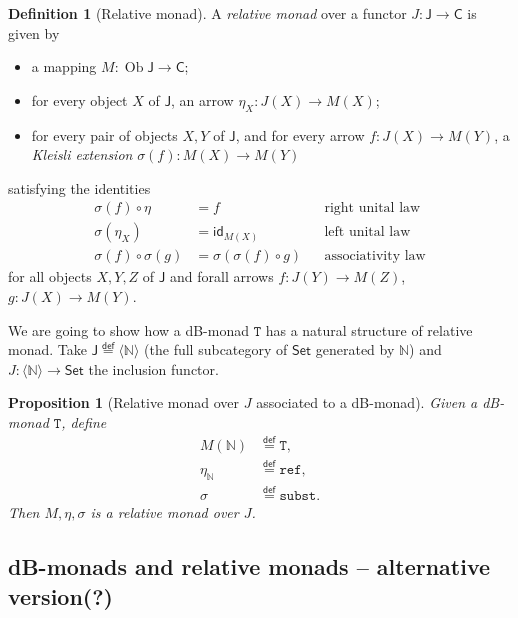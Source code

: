 \documentclass[a4paper,twoside,12pt]{article}
\newtheorem{proposition}{Proposition}
\theoremstyle{definition}
\newtheorem{definition}{Definition}
\theoremstyle{remark}
\DeclareMathOperator{\Ob}{Ob}
\newcommand{\NN}{\mathbb{N}}
\newcommand{\subst}{\mathtt{subst}}
\newcommand{\refe}{\mathtt{ref}}
\newcommand{\TT}{\mathtt{T}}
\begin{document}
\begin{definition}[Relative monad]
  A \emph{relative monad} over a functor
  $J\colon \mathsf{J}\to \mathsf{C}$ is given by
  \begin{itemize}
  \item a mapping $M:\Ob \mathsf{J} \to \mathsf{C}$;
  \item for every object $X$ of $\mathsf{J}$, an arrow $\eta_X\colon
    J(X) \to M(X)$;
  \item for every pair of objects $X,Y$ of $\mathsf{J}$, and for every
    arrow $f\colon J(X) \to M(Y)$, a \emph{Kleisli extension}
    $\sigma(f) \colon M(X) \to M(Y)$
  \end{itemize}
  satisfying the identities
  \begin{align*}
    \sigma(f) \circ \eta &= f &&\text{right unital law} \\
    \sigma(\eta_X) &= \mathsf{id}_{M(X)} &&\text{left unital law} \\
    \sigma(f) \circ \sigma(g) &= \sigma(\sigma(f) \circ g) &&\text{associativity law}
  \end{align*}
  for all objects $X,Y,Z$ of $\mathsf{J}$ and forall arrows
  $f\colon J(Y)\to M(Z)$, $g\colon J(X)\to M(Y)$.
\end{definition}

We are going to show how a dB-monad $\TT$ has a natural structure of
relative monad.  Take
$\mathsf{J} \stackrel{\mathsf{def}}{=}\langle \NN \rangle$ (the full
subcategory of $\mathsf{Set}$ generated by $\NN$) and
$J\colon \langle \NN \rangle \to \mathsf{Set}$ the inclusion functor.

\begin{proposition}[Relative monad over $J$ associated to a dB-monad]
  Given a dB-monad $\TT$, define
  \begin{align*}
    M(\NN) &\stackrel{\mathsf{def}}{=} \TT, \\
    \eta_\NN &\stackrel{\mathsf{def}}{=} \refe, \\
    \sigma &\stackrel{\mathsf{def}}{=} \subst.
  \end{align*}
  Then $M,\eta,\sigma$ is a relative monad over $J$.
\end{proposition}

\subsection{dB-monads and relative monads -- alternative version(?)}
\label{sec:subst-rel-monads-alt}
\end{document}
